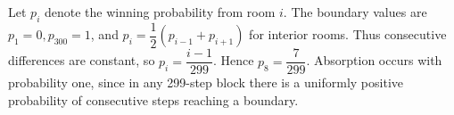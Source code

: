 Let $p_i$ denote the winning probability from room $i$. The boundary values are $p_1=0,p_{300}=1$, and $p_i=\dfrac{1}{2}(p_{i-1}+p_{i+1})$ for interior rooms. Thus consecutive differences are constant, so $p_i=\dfrac{i-1}{299}$. Hence $\boxed{p_8=\dfrac{7}{299}}$. Absorption occurs with probability one, since in any 299-step block there is a uniformly positive probability of consecutive steps reaching a boundary.

